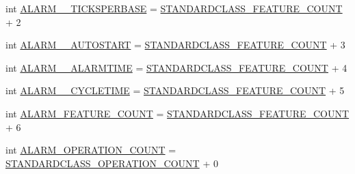 \begin{DoxyCompactItemize}
\item 
int \hyperlink{interfaceshootingmachineemfmodel_1_1_shootingmachineemfmodel_package_a92b942ea41959a2f51c36cfed7dae63a}{A\-L\-A\-R\-M\-\_\-\-\_\-\-T\-I\-C\-K\-S\-P\-E\-R\-B\-A\-S\-E} = \hyperlink{interfaceshootingmachineemfmodel_1_1_shootingmachineemfmodel_package_a14037f66989b3107e402142df96ee9aa}{S\-T\-A\-N\-D\-A\-R\-D\-C\-L\-A\-S\-S\-\_\-\-F\-E\-A\-T\-U\-R\-E\-\_\-\-C\-O\-U\-N\-T} + 2
\item 
int \hyperlink{interfaceshootingmachineemfmodel_1_1_shootingmachineemfmodel_package_a0edfc49ad0b13db0ade229866f2b9b2a}{A\-L\-A\-R\-M\-\_\-\-\_\-\-A\-U\-T\-O\-S\-T\-A\-R\-T} = \hyperlink{interfaceshootingmachineemfmodel_1_1_shootingmachineemfmodel_package_a14037f66989b3107e402142df96ee9aa}{S\-T\-A\-N\-D\-A\-R\-D\-C\-L\-A\-S\-S\-\_\-\-F\-E\-A\-T\-U\-R\-E\-\_\-\-C\-O\-U\-N\-T} + 3
\item 
int \hyperlink{interfaceshootingmachineemfmodel_1_1_shootingmachineemfmodel_package_ac5eb3c5a5b86a0035eaf0b1d873ada39}{A\-L\-A\-R\-M\-\_\-\-\_\-\-A\-L\-A\-R\-M\-T\-I\-M\-E} = \hyperlink{interfaceshootingmachineemfmodel_1_1_shootingmachineemfmodel_package_a14037f66989b3107e402142df96ee9aa}{S\-T\-A\-N\-D\-A\-R\-D\-C\-L\-A\-S\-S\-\_\-\-F\-E\-A\-T\-U\-R\-E\-\_\-\-C\-O\-U\-N\-T} + 4
\item 
int \hyperlink{interfaceshootingmachineemfmodel_1_1_shootingmachineemfmodel_package_a0ab335e15d518650cd47ece0bf137051}{A\-L\-A\-R\-M\-\_\-\-\_\-\-C\-Y\-C\-L\-E\-T\-I\-M\-E} = \hyperlink{interfaceshootingmachineemfmodel_1_1_shootingmachineemfmodel_package_a14037f66989b3107e402142df96ee9aa}{S\-T\-A\-N\-D\-A\-R\-D\-C\-L\-A\-S\-S\-\_\-\-F\-E\-A\-T\-U\-R\-E\-\_\-\-C\-O\-U\-N\-T} + 5
\item 
int \hyperlink{interfaceshootingmachineemfmodel_1_1_shootingmachineemfmodel_package_a4236d01c86578b67309fd2839b61148c}{A\-L\-A\-R\-M\-\_\-\-F\-E\-A\-T\-U\-R\-E\-\_\-\-C\-O\-U\-N\-T} = \hyperlink{interfaceshootingmachineemfmodel_1_1_shootingmachineemfmodel_package_a14037f66989b3107e402142df96ee9aa}{S\-T\-A\-N\-D\-A\-R\-D\-C\-L\-A\-S\-S\-\_\-\-F\-E\-A\-T\-U\-R\-E\-\_\-\-C\-O\-U\-N\-T} + 6
\item 
int \hyperlink{interfaceshootingmachineemfmodel_1_1_shootingmachineemfmodel_package_a4abb13fde140669afe6ee64c769d6431}{A\-L\-A\-R\-M\-\_\-\-O\-P\-E\-R\-A\-T\-I\-O\-N\-\_\-\-C\-O\-U\-N\-T} = \hyperlink{interfaceshootingmachineemfmodel_1_1_shootingmachineemfmodel_package_a2fe5d848cfe0a02fe5609e2c5ed7e7c7}{S\-T\-A\-N\-D\-A\-R\-D\-C\-L\-A\-S\-S\-\_\-\-O\-P\-E\-R\-A\-T\-I\-O\-N\-\_\-\-C\-O\-U\-N\-T} + 0

\end{DoxyCompactItemize}
